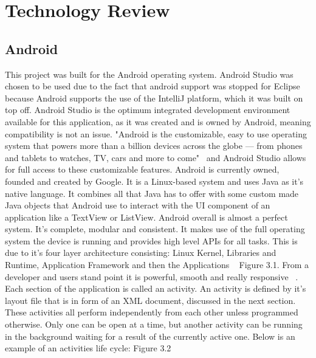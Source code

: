 \chapter{Technology Review}

\section{Android}
This project was built for the Android operating system. Android Studio was chosen to be used due to the fact that android support was stopped for Eclipse because Android supports the use of the IntelliJ platform, which it was built on top off. Android Studio is the optimum integrated development environment available for this application, as it was created and is owned by Android, meaning compatibility is not an issue. "Android is the customizable, easy to use operating system that powers more than a billion devices across the globe — from phones and tablets to watches, TV, cars and more to come"~\cite{android} and Android Studio allows for full access to these customizable features. Android is currently owned, founded and created by Google. It is a Linux-based system and uses Java as it's native language. It combines all that Java has to offer with some custom made Java objects that Android use to interact with the UI component of an application like a TextView or ListView. Android overall is almost a perfect system. It's complete, modular and consistent. It makes use of the full operating system the device is running and provides high level APIs for all tasks. This is due to it's four layer architecture consisting: Linux Kernel, Libraries and Runtime, Application Framework and then the Applications ~\cite{androidarch} Figure 3.1. From a developer and users stand point it is powerful, smooth and really responsive ~\cite{androidsystem}. Each section of the application is called an activity. An activity is defined by it's layout file that is in form of an XML document, discussed in the next section. These activities all perform independently from each other unless programmed otherwise. Only one can be open at a time, but another activity can be running in the background waiting for a result of the currently active one. Below is an example of an activities life cycle: Figure 3.2

